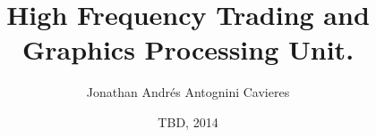 \pagestyle{fancy}

\rhead[]{\leftmark}
\lhead[\rightmark]{}
\cfoot{}

\renewcommand{\chaptermark}[1]{\markleft{\thechapter #1}}
\renewcommand{\sectionmark}[1]{\markright{\thesection #1}}
\renewcommand{\chaptermark}[1]{\markboth{\chaptername \ \thechapter. #1}{}}

\newcommand{\contrib}[3]{#1\quad$<$\texttt{#2}$>$%
{\small\\\quad\textit{#3}}\\[1ex]}

\newcommand{\titulo}{%
    High Frequency Trading and Graphics Processing Unit.
}%
\newcommand{\autor}{Jonathan Andrés Antognini Cavieres}

\title{\titulo}
\author{\autor}

\date{TBD, 2014}
\frenchspacing
\makeindex
